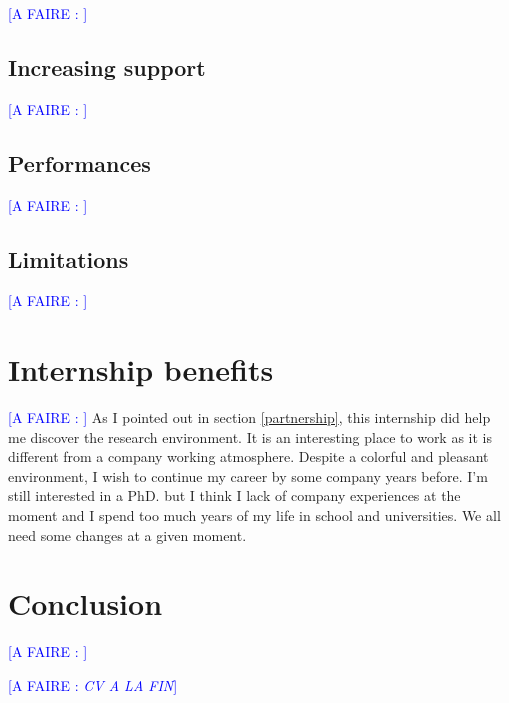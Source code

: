 \documentclass[a4paper,11pt]{article}
\newcommand*{\todo}[1]{\textcolor{blue}{[A FAIRE : \emph{#1}]}}
\begin{document}
\todo{}
\subsection{Increasing support}

\todo{}

\subsection{Performances}

\todo{}
\subsection{Limitations}

\todo{}

\clearpage
\section{Internship benefits}

\todo{}
As I pointed out in section \ref{partnership}, this internship did help me discover the research environment. It is an interesting place to work as it is different from a company working atmosphere. Despite a colorful and pleasant environment, I wish to continue my career by some company years before. I'm still interested in a PhD. but I think I lack of company experiences at the moment and I spend too much years of my life in school and universities. We all need some changes at a given moment.

\clearpage

\section{Conclusion}

\todo{}

\todo{CV A LA FIN}
\clearpage




\newpage


\end{document}
